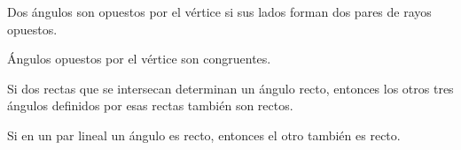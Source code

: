 \begin{definition}
    Dos ángulos son opuestos por el vértice si sus lados forman dos pares de rayos opuestos.
\end{definition}

\begin{theorem}
    Ángulos opuestos por el vértice son congruentes.

    \begin{figure}[!h]
        \centering
        
        \label{fig:vertex-angle}
    \end{figure}
    
\end{theorem}

\begin{theorem}
    Si dos rectas que se intersecan determinan un ángulo recto, entonces los otros tres ángulos definidos por esas rectas también son rectos.
\end{theorem}

\begin{theorem}
    Si en un par lineal un ángulo es recto, entonces el otro también es recto.
\end{theorem}
